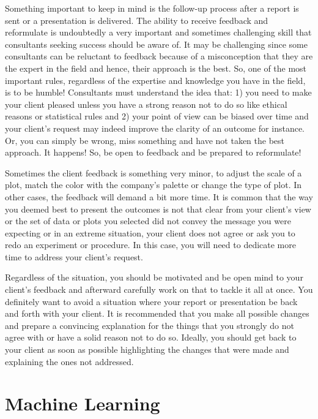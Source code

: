 \documentclass[
]{krantz}
\begin{document}
Something important to keep in mind is the follow-up process after a report is sent or a presentation is delivered. The ability to receive feedback and reformulate is undoubtedly a very important and sometimes challenging skill that consultants seeking success should be aware of. It may be challenging since some consultants can be reluctant to feedback because of a misconception that they are the expert in the field and hence, their approach is the best. So, one of the most important rules, regardless of the expertise and knowledge you have in the field, is to be humble! Consultants must understand the idea that: 1) you need to make your client pleased unless you have a strong reason not to do so like ethical reasons or statistical rules and 2) your point of view can be biased over time and your client's request may indeed improve the clarity of an outcome for instance. Or, you can simply be wrong, miss something and have not taken the best approach. It happens! So, be open to feedback and be prepared to reformulate!

Sometimes the client feedback is something very minor, to adjust the scale of a plot, match the color with the company's palette or change the type of plot. In other cases, the feedback will demand a bit more time. It is common that the way you deemed best to present the outcomes is not that clear from your client's view or the set of data or plots you selected did not convey the message you were expecting or in an extreme situation, your client does not agree or ask you to redo an experiment or procedure. In this case, you will need to dedicate more time to address your client's request.

Regardless of the situation, you should be motivated and be open mind to your client's feedback and afterward carefully work on that to tackle it all at once. You definitely want to avoid a situation where your report or presentation be back and forth with your client. It is recommended that you make all possible changes and prepare a convincing explanation for the things that you strongly do not agree with or have a solid reason not to do so. Ideally, you should get back to your client as soon as possible highlighting the changes that were made and explaining the ones not addressed.

\hypertarget{machine-learning}{%
\chapter{Machine Learning}\label{machine-learning}}
\end{document}
